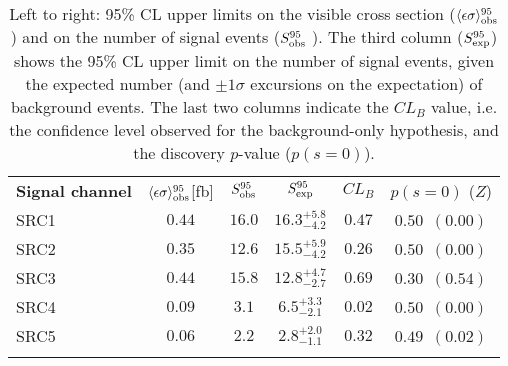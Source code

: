 
\begin{table}[!h]
\centering
\setlength{\tabcolsep}{0.0pc}
\begin{tabular*}{\textwidth}{@{\extracolsep{\fill}}lccccc}
\noalign{\smallskip}\hline\noalign{\smallskip}
{\bf Signal channel}                        & $\langle\epsilon{\rm \sigma}\rangle_{\rm obs}^{95}$[fb]  &  $S_{\rm obs}^{95}$  & $S_{\rm exp}^{95}$ & $CL_{B}$ & $p(s=0)$ ($Z$)  \\
\noalign{\smallskip}\hline\noalign{\smallskip}
SRC1    & $0.44$ &  $16.0$ & $ { 16.3 }^{ +5.8 }_{ -4.2 }$ & $0.47$ &
 $ 0.50$~$(0.00)$ \\%
SRC2    & $0.35$ &  $12.6$ & $ { 15.5 }^{ +5.9 }_{ -4.2 }$ & $0.26$ &
$ 0.50$~$(0.00)$ \\%
SRC3    & $0.44$ &  $15.8$ & $ { 12.8 }^{ +4.7 }_{ -2.7 }$ & $0.69$ &
$ 0.30$~$(0.54)$ \\%
SRC4    & $0.09$ &  $3.1$ & $ { 6.5 }^{ +3.3 }_{ -2.1 }$ & $0.02$ & $
0.50$~$(0.00)$ \\%
SRC5    & $0.06$ &  $2.2$ & $ { 2.8 }^{ +2.0 }_{ -1.1 }$ & $0.32$ & $
0.49$~$(0.02)$ \\%

\noalign{\smallskip}\hline\noalign{\smallskip}
\end{tabular*}
\caption[Breakdown of upper limits.]{
Left to right: 95\% CL upper limits on the visible cross section
($\langle\epsilon\sigma\rangle_{\rm obs}^{95}$) and on the number of
signal events ($S_{\rm obs}^{95}$ ).  The third column
($S_{\rm exp}^{95}$) shows the 95\% CL upper limit on the number of
signal events, given the expected number (and $\pm 1\sigma$
excursions on the expectation) of background events.
The last two columns
indicate the $CL_B$ value, i.e. the confidence level observed for
the background-only hypothesis, and the discovery $p$-value ($p(s = 0)$). 
\label{table.results.exclxsec.pval.upperlimit}}
\end{table}
%
